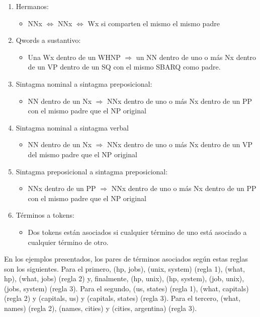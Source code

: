\begin{enumerate}
\item Hermanos:
  \begin{itemize}
    \item  NNx $\Leftrightarrow$ NNx $\Leftrightarrow$ Wx si comparten el mismo el mismo padre
  \end{itemize}
\item Qwords a sustantivo:
  \begin{itemize}
    \item Una Wx dentro de un WHNP $\Rightarrow$ un NN dentro de uno o más Nx dentro de un VP dentro de un SQ con el mismo SBARQ como padre.
  \end{itemize}
\item Sintagma nominal a sintagma preposicional:
  \begin{itemize}
    \item NN dentro de un Nx $\Rightarrow$ NNx dentro de uno o más Nx dentro de un PP con el mismo padre que el NP original
  \end{itemize}
\item Sintagma nominal a sintagma verbal
    \begin{itemize}
      \item NN dentro de un Nx $\Rightarrow$ NNx dentro de uno o más Nx dentro de un VP del mismo padre que el NP original
    \end{itemize}
\item Sintagma preposicional a sintagma preposicional:
  \begin{itemize}
    \item NNx dentro de un PP $\Rightarrow$ NNx dentro de uno o más Nx dentro de un PP con el mismo padre que el NP original
  \end{itemize}
  \item Términos a tokens:
  \begin{itemize}
    \item Dos tokens están asociados si cualquier término de uno está asociado a cualquier término de otro.
  \end{itemize}
\end{enumerate}

En los ejemplos presentados, los pares de términos asociados según estas reglas son los siguientes. Para el primero, (hp, jobs), (unix, system)  (regla 1), (what, hp), (what, jobs) (regla 2) y, finalmente, (hp, unix), (hp, system), (job, unix), (jobs, system) (regla 3). Para el segundo, (us, states) (regla 1), (what, capitals) (regla 2) y (capitals, us) y (capitals, states) (regla 3). Para el tercero, (what, names) (regla 2), (names, cities) y (cities, argentina) (regla 3).
\newline

